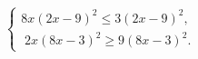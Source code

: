 \begin{ex}[type=ineq_system]
	\begin{condition}
		$\begin{cases} 8x(2x - 9)^2\leqslant3(2x - 9)^2 ,\\
			\;  2x(8x - 3)^2\geqslant9(8x - 3)^2.
		\end{cases}$
	\end{condition}
\end{ex}
